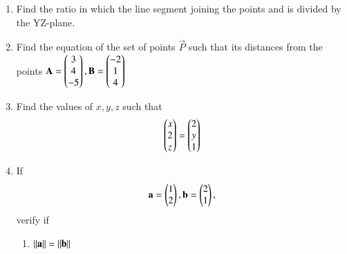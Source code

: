 \begin{enumerate}[label=\arabic*.,ref=\thesubsection.\theenumi]
%
\item Find the ratio in which the line segment joining the points  and  is divided by the YZ-plane.
%
\item Find the equation of the set of points $\vec{P}$ such that its distances from the points
$
\mathbf{A}=\begin{pmatrix}3\\4\\-5\end{pmatrix}, 
\mathbf{B}=\begin{pmatrix}-2\\1\\4\end{pmatrix}
$ 
%
\item Find the values of $x, y, z$ such that 
\begin{align}
\begin{pmatrix}x\\2\\z\end{pmatrix}= \begin{pmatrix}2\\y\\1\end{pmatrix}
\end{align}
%
\item If
\begin{align}
\mathbf{a} = \begin{pmatrix}1\\2\end{pmatrix}, \mathbf{b} = \begin{pmatrix}2\\1\end{pmatrix},
\end{align}
verify if  
\begin{enumerate}
\item $\left\lVert\mathbf{a}\right\rVert=\left\lVert\mathbf{b}\right\rVert$


\end{enumerate}
\end{enumerate}
